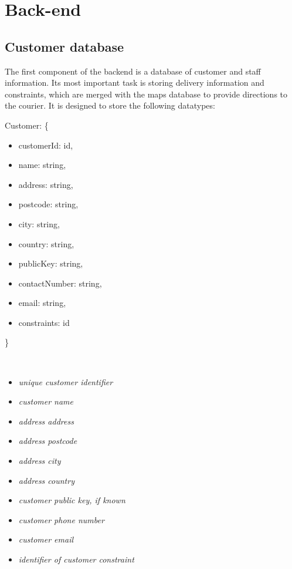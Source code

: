 \section{Back-end} \label{backendarch}
\subsection{Customer database} \label{databasearch}
\begin{flushleft}
The first component of the backend is a database of customer and staff information. Its most important task is storing delivery information and constraints, which are merged with the maps database to provide directions to the courier. It is designed to store the following datatypes:
\end{flushleft}
\begin{minipage}{6.5cm}
    Customer: \{
    \begin{itemize} 
        \itemsep-0.5em
        \item[] customerId: id,
        \item[] name: string,
        \item[] address: string,
        \item[] postcode: string,
        \item[] city: string,
        \item[] country: string,
        \item[] publicKey: string,
        \item[] contactNumber: string,
        \item[] email: string,
        \item[] constraints: id
    \end{itemize}
    \}
\end{minipage}
\begin{minipage}{10cm}
    \hspace{1cm} \\
    \begin{itemize}
        \itemsep-0.5em
        \item[] \textit{unique customer identifier}
        \item[] \textit{customer name}
        \item[] \textit{address address}
        \item[] \textit{address postcode}
        \item[] \textit {address city}
        \item[] \textit{address country}
        \item[] \textit{customer public key, if known}
        \item[] \textit{customer phone number}
        \item[] \textit{customer email}
        \item[] \textit{identifier of customer constraint}
    \end{itemize}
    \hspace{1cm} \\
\end{minipage}
